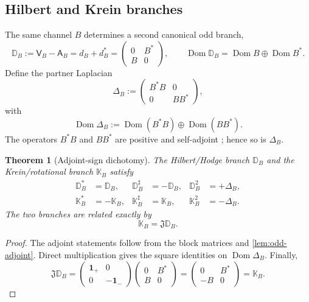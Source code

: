 \documentclass[11pt,reqno]{scrartcl}
\newcommand{\fundJ}{\mathfrak J}
\newcommand{\idop}{\mathbf 1}
\newcommand{\Aop}{\mathsf A}
\newcommand{\Vop}{\mathsf V}
\newcommand{\DB}{\mathbb D}
\newcommand{\KB}{\mathbb K}
\newcommand{\DeltaB}{\Delta}
\DeclareMathOperator{\Dom}{Dom}
\theoremstyle{plain}
\newtheorem{theorem}{Theorem}[section]
\theoremstyle{definition}
\theoremstyle{remark}
\begin{document}
\subsection{Hilbert and Krein branches}

The same channel \(B\) determines a second canonical odd branch,
\begin{equation}
  \DB_B:=\Vop_B-\Aop_B
  =d_B+d_B^*
  =
  \begin{pmatrix}
    0&B^*\\
    B&0
  \end{pmatrix},
  \qquad
  \Dom\DB_B=\Dom B\oplus\Dom B^*.
  \label{eq:DB}
\end{equation}
Define the partner Laplacian
\begin{equation}
  \DeltaB_B:=
  \begin{pmatrix}
    B^*B&0\\
    0&BB^*
  \end{pmatrix},
  \label{eq:DeltaB}
\end{equation}
with
\begin{equation}
  \Dom\DeltaB_B
  :=\Dom(B^*B)\oplus\Dom(BB^*).
\end{equation}
The operators \(B^*B\) and \(BB^*\) are positive and self-adjoint \cite{Kato,ReedSimon}; hence so
is \(\DeltaB_B\).

\begin{theorem}[Adjoint-sign dichotomy]
\label{thm:dichotomy}
The Hilbert/Hodge branch \(\DB_B\) and the Krein/rotational branch
\(\KB_B\) satisfy
\begin{align}
  \DB_B^*&=\DB_B,
  &\DB_B^\sharp&=-\DB_B,
  &\DB_B^2&=+\DeltaB_B,
  \label{eq:D-branch}\\
  \KB_B^*&=-\KB_B,
  &\KB_B^\sharp&=\KB_B,
  &\KB_B^2&=-\DeltaB_B.
  \label{eq:K-branch}
\end{align}
The two branches are related exactly by
\begin{equation}
  \boxed{\KB_B=\fundJ\DB_B.}
  \label{eq:KJD}
\end{equation}
\end{theorem}

\begin{proof}
The adjoint statements follow from the block matrices and
\cref{lem:odd-adjoint}. Direct multiplication gives the square identities on
\(\Dom\DeltaB_B\). Finally,
\begin{equation}
  \fundJ\DB_B
  =
  \begin{pmatrix}
    \idop_+&0\\0&-\idop_-
  \end{pmatrix}
  \begin{pmatrix}
    0&B^*\\B&0
  \end{pmatrix}
  =
  \begin{pmatrix}
    0&B^*\\-B&0
  \end{pmatrix}
  =\KB_B.
\end{equation}
\end{proof}
\end{document}
